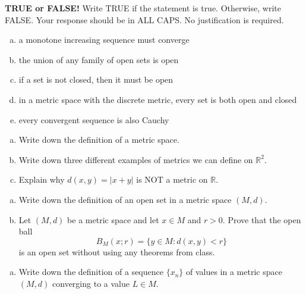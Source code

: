 \documentclass[11pt]{exam}
\theoremstyle{definition}
\begin{document}
\begin{questions}

\addpoints

\question[10]\mbox{}
\textbf{TRUE or FALSE!}  Write  TRUE if the statement is true.  Otherwise, write FALSE.  Your response should be in ALL CAPS.  No justification is required.
\begin{enumerate}[(a)]
\item a monotone increasing sequence must converge 
\vspace{1.2in}
\item the union of any family of open sets is open
\vspace{1.2in}
\item if a set is not closed, then it must be open
\vspace{1.2in}
\item in a metric space with the discrete metric, every set is both open and closed
\vspace{1.2in}
\item every convergent sequence is also Cauchy
\vspace{1.2in}
\end{enumerate}

\newpage
\question[10]\mbox{}

\begin{enumerate}[(a)]
\item
Write down the definition of a metric space.
\vspace{3in}
\item 
Write down three different examples of metrics we can define on $\mathbb{R}^2$.
\vspace{2in}
\item 
Explain why $d(x,y) = |x+y|$ is NOT a metric on $\mathbb{R}$.
\end{enumerate}

\newpage
\question[10]\mbox{}

\begin{enumerate}[(a)]
\item
Write down the definition of an open set in a metric space $(M,d)$.
\vspace{1in}
\item 
Let $(M,d)$ be a metric space and let $x\in M$ and $r>0$.
Prove that the open ball
$$B_M(x;r)=\{y\in M: d(x,y) < r\}$$
is an open set without using any theorems from class.
\end{enumerate}

\newpage
\question[10]\mbox{}
\begin{enumerate}[(a)]
\item Write down the definition of a sequence $\{x_n\}$ of values in a metric space $(M,d)$ converging to a value $L\in M$.
\vspace{1in}


\end{enumerate}
\end{questions}
\end{document}
